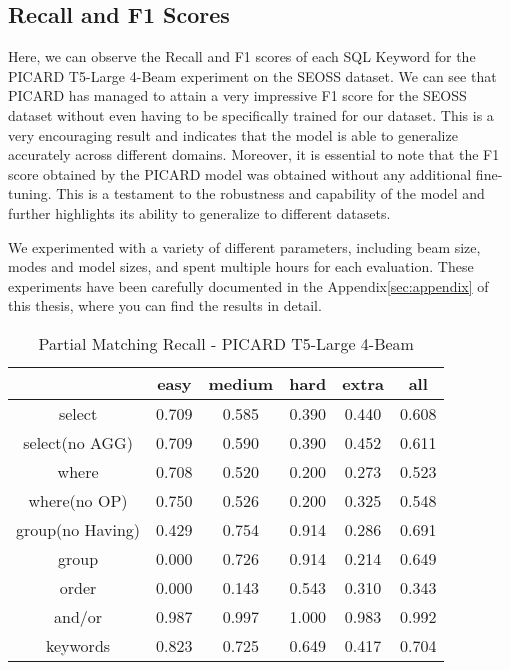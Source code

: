 \subsection{Recall and F1 Scores}

Here, we can observe the Recall and F1 scores of each SQL Keyword for the PICARD T5-Large 4-Beam experiment on the SEOSS dataset. We can see that PICARD has managed to attain a very impressive F1 score for the SEOSS dataset without even having to be specifically trained for our dataset. This is a very encouraging result and indicates that the model is able to generalize accurately across different domains. Moreover, it is essential to note that the F1 score obtained by the PICARD model was obtained without any additional fine-tuning. This is a testament to the robustness and capability of the model and further highlights its ability to generalize to different datasets.

We experimented with a variety of different parameters, including beam size, modes and model sizes, and spent multiple hours for each evaluation. These experiments have been carefully documented in the Appendix\ref{sec:appendix} of this thesis, where you can find the results in detail.


\begin{table}[h]
    \centering
    \begin{tabular}{|c|c|c|c|c|c|}
        \hline
                         & easy  & medium & hard  & extra & all   \\ \hline
        select           & 0.709 & 0.585  & 0.390 & 0.440 & 0.608 \\ \hline
        select(no AGG)   & 0.709 & 0.590  & 0.390 & 0.452 & 0.611 \\ \hline
        where            & 0.708 & 0.520  & 0.200 & 0.273 & 0.523 \\ \hline
        where(no OP)     & 0.750 & 0.526  & 0.200 & 0.325 & 0.548 \\ \hline
        group(no Having) & 0.429 & 0.754  & 0.914 & 0.286 & 0.691 \\ \hline
        group            & 0.000 & 0.726  & 0.914 & 0.214 & 0.649 \\ \hline
        order            & 0.000 & 0.143  & 0.543 & 0.310 & 0.343 \\ \hline
        and/or           & 0.987 & 0.997  & 1.000 & 0.983 & 0.992 \\ \hline
        keywords         & 0.823 & 0.725  & 0.649 & 0.417 & 0.704 \\ \hline
    \end{tabular}
    \caption{Partial Matching Recall - PICARD T5-Large 4-Beam}

\end{table}

